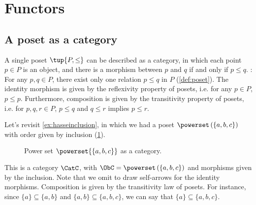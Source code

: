 \section{Functors}

\subsection{A poset as a category}
\label{sec:posetsarecats}
A single poset $\tup{P, \leq}$ can be described as a category, in which
each point $p\in P$ is an object, and there is a morphism between
$p$ and $q$ if and only if $p \leq q$. : For any $p,q\in P$, there exist only one relation $p\leq q$ in $P$ (\cref{def:poset}). The identity morphism is given by the reflexivity property of posets, i.e. for any $p\in P$, $p\leq p$. Furthermore, composition is given by the transitivity property of posets, i.e. for $p,q,r \in P$, $p\leq q$ and $q\leq r$ implies $p\leq r$.

\begin{example}
Let's revisit \cref{ex:hasseinclusion}, in which we had a poset $\powerset\left(\{a,b,c\}\right)$ with order given by inclusion (\cref{fig:posetascat}).
\begin{figure}[h!]
\begin{center}
\end{center}
\caption{Power set $\powerset{\{a,b,c\}}$ as a category. \label{fig:posetascat}}
\end{figure}
This is a category $\CatC$, with $\ObC=\powerset\left(\{a,b,c\}\right)$ and morphisms given by the inclusion. Note that we omit to draw self-arrows for the identity morphisms. Composition is given by the transitivity law of posets. For instance, since $\{a\}\subseteq \{a,b\}$ and $\{a,b\} \subseteq \{a,b,c\}$, we can say that $\{a\}\subseteq \{a,b,c\}$.
\end{example}


